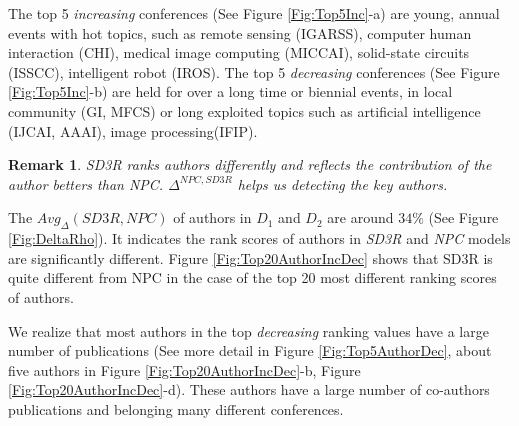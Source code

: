 \documentclass[10pt,leqno,twoside]{article}
\newtheorem{remark}{\indent Remark}[section]
\begin{document}
The top 5 \textit{increasing} conferences (See Figure \ref{Fig:Top5Inc}-a) are young, annual events with hot topics, such as remote sensing (IGARSS), computer human interaction (CHI), medical image computing (MICCAI), solid-state circuits (ISSCC), intelligent robot (IROS). The top 5 \textit{decreasing} conferences (See Figure \ref{Fig:Top5Inc}-b) are held for over a long time or biennial events, in local community (GI, MFCS) or long exploited topics such as artificial intelligence (IJCAI, AAAI), image processing(IFIP).
\begin{remark}
SD3R ranks authors differently and reflects the contribution of the author betters than NPC.
$\Delta^{NPC,SD3R}$ helps us  detecting the key authors.
\end{remark}
The $Avg_{\Delta}(SD3R,NPC)$ of authors in $D_1$ and $D_2$ are around $34\%$ (See Figure \ref{Fig:DeltaRho}). It indicates the rank scores of authors in \textit{SD3R} and \textit{NPC} models are significantly different. Figure \ref{Fig:Top20AuthorIncDec} shows that SD3R is quite different from NPC in the case of the top 20 most different ranking scores of authors.

We realize that most authors in the top \textit{decreasing} ranking values have a large number of publications (See more detail in Figure \ref{Fig:Top5AuthorDec}, about five authors in Figure \ref{Fig:Top20AuthorIncDec}-b, Figure \ref{Fig:Top20AuthorIncDec}-d). These authors have a large number of co-authors publications and belonging many different conferences.
\end{document}
